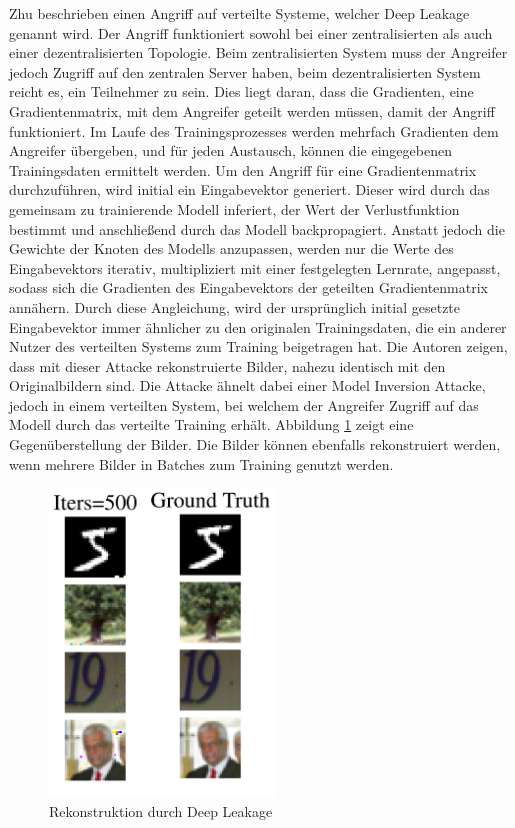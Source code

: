 Zhu \etal \cite{P-18} beschrieben einen Angriff auf verteilte Systeme, welcher Deep Leakage genannt wird.
Der Angriff funktioniert sowohl bei einer zentralisierten als auch einer dezentralisierten Topologie. 
Beim zentralisierten System muss der Angreifer jedoch Zugriff auf den zentralen Server haben, beim dezentralisierten System reicht es, ein Teilnehmer zu sein.
Dies liegt daran, dass die Gradienten, \bzw eine Gradientenmatrix, mit dem Angreifer geteilt werden müssen, damit der Angriff funktioniert.
Im Laufe des Trainingsprozesses werden mehrfach Gradienten dem Angreifer übergeben, und für jeden Austausch, können die eingegebenen Trainingsdaten ermittelt werden.
Um den Angriff für eine Gradientenmatrix durchzuführen, wird initial ein Eingabevektor generiert.
Dieser wird durch das gemeinsam zu trainierende Modell inferiert, der Wert der Verlustfunktion bestimmt und anschließend durch das Modell backpropagiert.
Anstatt jedoch die Gewichte der Knoten des Modells anzupassen, werden nur die Werte des Eingabevektors iterativ, multipliziert mit einer festgelegten Lernrate, angepasst, sodass sich die Gradienten des Eingabevektors der geteilten Gradientenmatrix annähern.
Durch diese Angleichung, wird der ursprünglich initial gesetzte Eingabevektor immer ähnlicher zu den originalen Trainingsdaten, die ein anderer Nutzer des verteilten Systems zum Training beigetragen hat.
Die Autoren zeigen, dass mit dieser Attacke rekonstruierte Bilder, nahezu identisch mit den Originalbildern sind.
Die Attacke ähnelt dabei einer Model Inversion Attacke, jedoch in einem verteilten System, bei welchem der Angreifer Zugriff auf das Modell durch das verteilte Training erhält.
Abbildung \ref{fig:deep_leakage} zeigt eine Gegenüberstellung der Bilder.
Die Bilder können ebenfalls rekonstruiert werden, wenn mehrere Bilder in Batches zum Training genutzt werden.

\begin{figure}[!htb]
    \centering
    \includegraphics[width=6cm]{figures/deep_leakage}
    \caption{Rekonstruktion durch Deep Leakage \cite{P-18}}
    \label{fig:deep_leakage}
\end{figure} 

